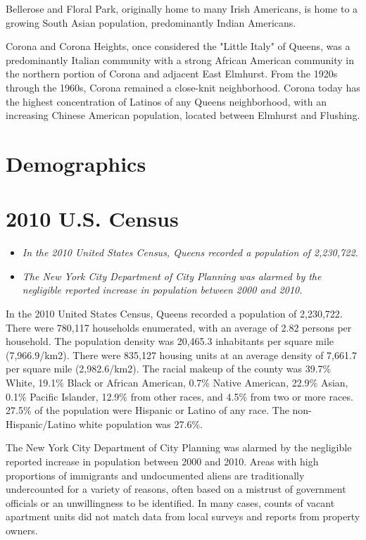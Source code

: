 Bellerose and Floral Park, originally home to many Irish Americans, is
home to a growing South Asian population, predominantly Indian
Americans.

Corona and Corona Heights, once considered the "Little Italy" of Queens,
was a predominantly Italian community with a strong African American
community in the northern portion of Corona and adjacent East Elmhurst.
From the 1920s through the 1960s, Corona remained a close-knit
neighborhood. Corona today has the highest concentration of Latinos of
any Queens neighborhood, with an increasing Chinese American population,
located between Elmhurst and Flushing.

\section{Demographics}\label{demographics}

\section{2010 U.S. Census}\label{u.s.-census}

\begin{itemize}
\item
  \emph{In the 2010 United States Census, Queens recorded a population
  of 2,230,722.}
\item
  \emph{The New York City Department of City Planning was alarmed by the
  negligible reported increase in population between 2000 and 2010.}
\end{itemize}

In the 2010 United States Census, Queens recorded a population of
2,230,722. There were 780,117 households enumerated, with an average of
2.82 persons per household. The population density was 20,465.3
inhabitants per square mile (7,966.9/km2). There were 835,127 housing
units at an average density of 7,661.7 per square mile (2,982.6/km2).
The racial makeup of the county was 39.7\% White, 19.1\% Black or
African American, 0.7\% Native American, 22.9\% Asian, 0.1\% Pacific
Islander, 12.9\% from other races, and 4.5\% from two or more races.
27.5\% of the population were Hispanic or Latino of any race. The
non-Hispanic/Latino white population was 27.6\%.

The New York City Department of City Planning was alarmed by the
negligible reported increase in population between 2000 and 2010. Areas
with high proportions of immigrants and undocumented aliens are
traditionally undercounted for a variety of reasons, often based on a
mistrust of government officials or an unwillingness to be identified.
In many cases, counts of vacant apartment units did not match data from
local surveys and reports from property owners.

